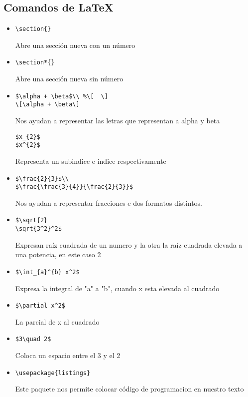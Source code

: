 \documentclass{book}
\begin{document}
	\subsection {Comandos de LaTeX}
	\begin{itemize}
		\item  
		\begin{lstlisting}  
\section{} 
		\end{lstlisting} Abre una sección nueva con un número
		\item 
		\begin{lstlisting}  
\section*{}
		\end{lstlisting} Abre una sección nueva sin número
		\item 
		\begin{lstlisting}  
$\alpha + \beta$\\ %\[  \]
\[\alpha + \beta\] 
		\end{lstlisting} Nos ayudan a representar las letras que representan a alpha y beta\\
		
		\begin{lstlisting}  
$x_{2}$
$x^{2}$
		\end{lstlisting}  Representa un subindice e indice respectivamente
		\item 
		\begin{lstlisting}  
$\frac{2}{3}$\\
$\frac{\frac{3}{4}}{\frac{2}{3}}$
		\end{lstlisting} Nos ayudan a representar fracciones e dos formatos distintos.
		\item
		\begin{lstlisting}  
$\sqrt{2} 
\sqrt{3^2}^2$
		\end{lstlisting} Expresan raíz cuadrada de un numero y la otra la raíz cuadrada elevada a una potencia, en este caso 2
		\item
		\begin{lstlisting} 
$\int_{a}^{b} x^2$
		\end{lstlisting} Expresa la integral de "a" a "b", cuando x esta elevada al cuadrado
		\item
		\begin{lstlisting}  
$\partial x^2$
		\end{lstlisting} La parcial de x al cuadrado
		\item
		\begin{lstlisting} 
$3\quad 2$ 			
		\end{lstlisting} Coloca un espacio entre el 3 y el 2
		\item
		\begin{lstlisting} 
\usepackage{listings}			
		\end{lstlisting} Este paquete nos permite colocar código de programacion en nuestro texto
		

\end{itemize}
\end{document}
